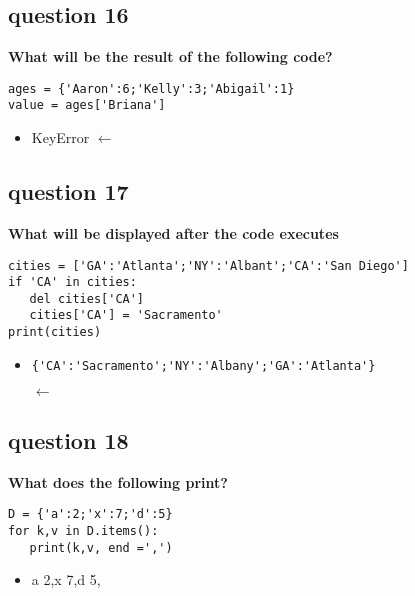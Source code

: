 \documentclass[10pt]{article}
\begin{document}
\subsection*{question 16}
\textbf{What will be the result of the following code?}
\begin{verbatim}
ages = {'Aaron':6;'Kelly':3;'Abigail':1}
value = ages['Briana']
\end{verbatim}
\begin{itemize}
\item KeyError $\leftarrow$
\end{itemize}
\subsection*{question 17}
\textbf{What will be displayed after the code executes}
\begin{verbatim}
cities = ['GA':'Atlanta';'NY':'Albant';'CA':'San Diego']
if 'CA' in cities:
   del cities['CA']
   cities['CA'] = 'Sacramento'
print(cities)
\end{verbatim}
\begin{itemize}
\item \begin{verbatim}
{'CA':'Sacramento';'NY':'Albany';'GA':'Atlanta'}
   \end{verbatim} $\leftarrow$
\end{itemize}
\subsection*{question 18}
\textbf{What does the following print?}
\begin{verbatim}
D = {'a':2;'x':7;'d':5}
for k,v in D.items():
   print(k,v, end =',')
\end{verbatim}
\begin{itemize}
\item a 2,x 7,d 5,
\end{itemize}
\end{document}
